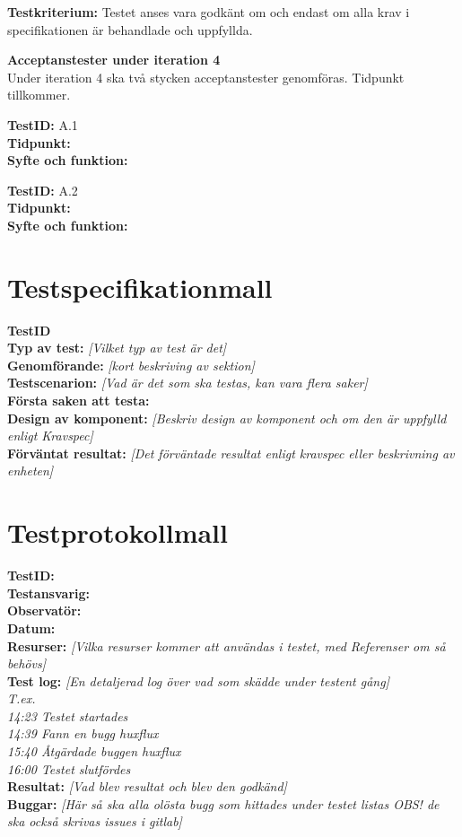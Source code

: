\documentclass[a4paper,10pt, twoside]{article}
\begin{document}
\textbf{Testkriterium:} Testet anses vara godkänt om och endast om alla krav i specifikationen är behandlade och uppfyllda.
\clearpage

\textbf{Acceptanstester under iteration 4}
\\ Under iteration 4 ska två stycken acceptanstester genomföras. Tidpunkt tillkommer. 

	\textbf{TestID:} A.1
 \\ \textbf{Tidpunkt:}
 \\ \textbf{Syfte och funktion:} 

 	\textbf{TestID:} A.2
 \\ \textbf{Tidpunkt:}
 \\ \textbf{Syfte och funktion:}

\printbibliography

\newpage

\appendix
\section{Testspecifikationmall}
\label{sec: Testspecifikationmall}

   \textbf{TestID}
\\ \textbf{Typ av test:} \emph{[Vilket typ av test är det]}
\\ \textbf{Genomförande:} \emph{[kort beskriving av sektion]}
\\ \textbf{Testscenarion:} \emph{[Vad är det som ska testas, kan vara flera saker]}
\\ \textbf{Första saken att testa:}
\\ \textbf{Design av komponent:} \emph{[Beskriv design av komponent och om den är uppfylld enligt Kravspec]}
\\ \textbf{Förväntat resultat:} \emph{[Det förväntade resultat enligt kravspec eller beskrivning av enheten]}

\newpage

\section{Testprotokollmall}
\label{sec: Testprotokollmall}


 \textbf{TestID:}
\\ \textbf{Testansvarig:\\Observatör:}
\\ \textbf{Datum:}
\\ \textbf{Resurser:} \emph{[Vilka resurser kommer att användas i testet, med Referenser om så behövs]}
\\ \textbf{Test log:} \emph{[En detaljerad log över vad som skädde under testent gång]\\ T.ex. \\ 14:23 Testet startades \\ 14:39 Fann en bugg huxflux \\ 15:40 Åtgärdade buggen huxflux \\ 16:00 Testet slutfördes}\
\\ \textbf{Resultat:} \emph{[Vad blev resultat och blev den godkänd]}
\\ \textbf{Buggar:} \emph{[Här så ska alla olösta bugg som hittades under testet listas OBS! de ska också skrivas issues i gitlab]}
\end{document}
